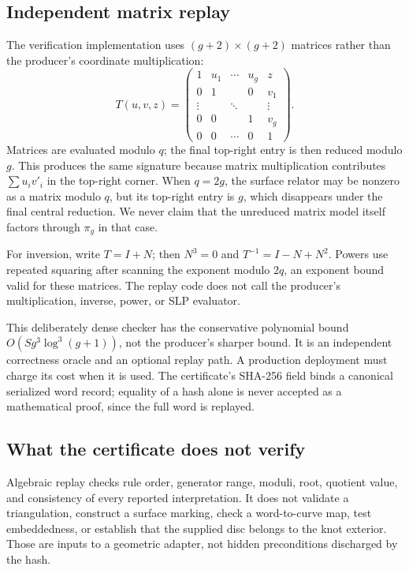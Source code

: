 \documentclass[11pt,letterpaper]{article}
\theoremstyle{definition}
\theoremstyle{remark}
\begin{document}
\subsection{Independent matrix replay}
The verification implementation uses $(g+2)\times(g+2)$ matrices rather than the producer's coordinate multiplication:
\begin{equation}\label{eq:matrix}
 T(u,v,z)=
 \begin{pmatrix}
  1&u_1&\cdots&u_g&z\\
  0&1&&0&v_1\\
  \vdots&&\ddots&&\vdots\\
  0&0&&1&v_g\\
  0&0&\cdots&0&1
 \end{pmatrix}.
\end{equation}
Matrices are evaluated modulo $q$; the final top-right entry is then reduced modulo $g$. This produces the same signature because matrix multiplication contributes $\sum u_iv'_i$ in the top-right corner. When $q=2g$, the surface relator may be nonzero as a matrix modulo $q$, but its top-right entry is $g$, which disappears under the final central reduction. We never claim that the unreduced matrix model itself factors through $\pi_g$ in that case.

For inversion, write $T=I+N$; then $N^3=0$ and $T^{-1}=I-N+N^2$. Powers use repeated squaring after scanning the exponent modulo $2q$, an exponent bound valid for these matrices. The replay code does not call the producer's multiplication, inverse, power, or SLP evaluator.

This deliberately dense checker has the conservative polynomial bound
$O(Sg^3\log^3(g+1))$, not the producer's sharper bound. It is an independent correctness oracle and an optional replay path. A production deployment must charge its cost when it is used. The certificate's SHA-256 field binds a canonical serialized word record; equality of a hash alone is never accepted as a mathematical proof, since the full word is replayed.

\subsection{What the certificate does not verify}
Algebraic replay checks rule order, generator range, moduli, root, quotient value, and consistency of every reported interpretation. It does not validate a triangulation, construct a surface marking, check a word-to-curve map, test embeddedness, or establish that the supplied disc belongs to the knot exterior. Those are inputs to a geometric adapter, not hidden preconditions discharged by the hash.
\end{document}
